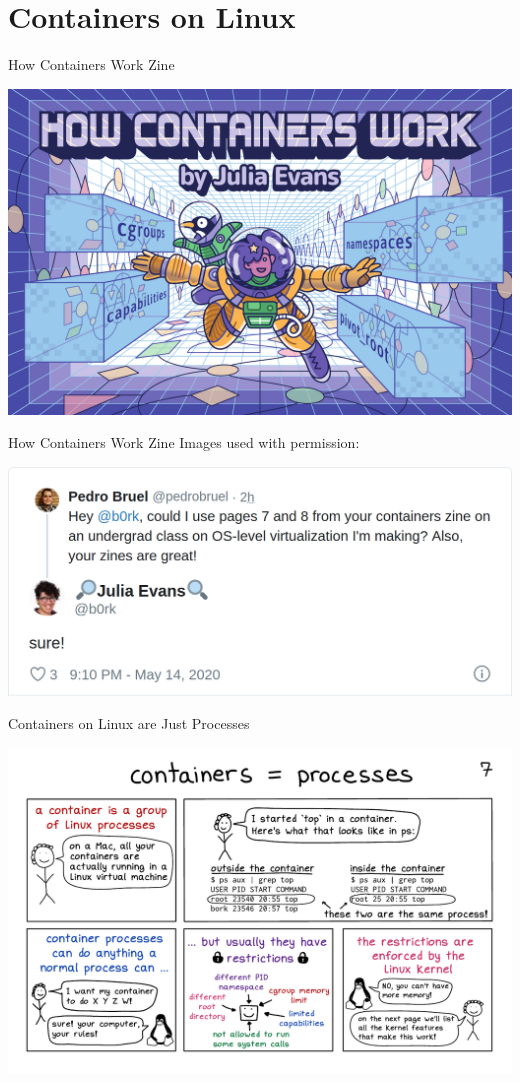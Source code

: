 \documentclass[10pt, compress, aspectratio=169, xcolor={table,usenames,dvipsnames}]{beamer}
\begin{document}
\section{Containers on Linux}
\label{sec:org580c00f}
\begin{frame}[label={sec:org6d5ce38}]{How Containers Work Zine}
\begin{center}
\includegraphics[width=.81\columnwidth]{../../img/how-containers-work_pg0.pdf}
\end{center}
\end{frame}
\begin{frame}[label={sec:org2748aaf}]{How Containers Work Zine}
Images used \alert{with permission}:
\begin{center}
\includegraphics[width=.72\columnwidth]{../../img/hcw_permission_twitter.png}
\end{center}
\end{frame}
\begin{frame}[label={sec:org546f2bf}]{Containers on Linux are Just Processes}
\begin{center}
\includegraphics[width=.86\columnwidth]{../../img/how-containers-work_pg7.pdf}
\end{center}
\end{frame}
\end{document}
